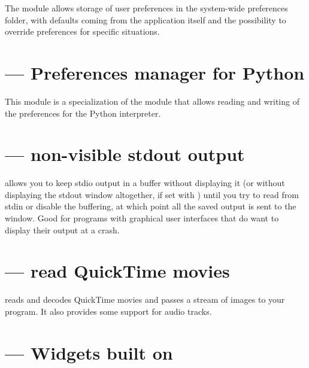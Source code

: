 The  module allows storage of user preferences in
the system-wide preferences folder, with defaults coming from the
application itself and the possibility to override preferences for
specific situations.


\section{ --- Preferences manager for Python}

This module is a specialization of the  module
that allows reading and writing of the preferences for the Python
interpreter.


\section{ --- non-visible stdout output}

 allows you to keep stdio output in a buffer
without displaying it (or without displaying the stdout window
altogether, if set with ) until you try to read from
stdin or disable the buffering, at which point all the saved output is
sent to the window.  Good for programs with graphical user interfaces
that do want to display their output at a crash.


\section{ --- read QuickTime movies}

 reads and decodes QuickTime movies and passes
a stream of images to your program. It also provides some support for
audio tracks.

\section{ --- Widgets built on }

